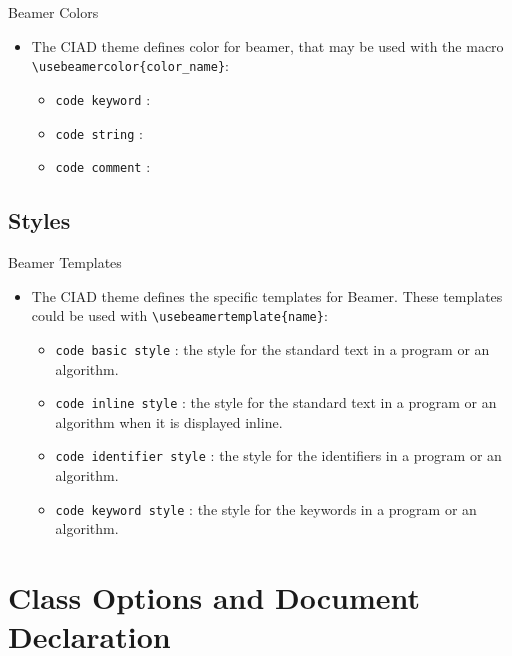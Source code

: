 \documentclass[english,sectioncirclenumberstyle]{ciadbeamer}
\begin{document}
\begin{frame}{Beamer Colors}
	\begin{itemize}
	\item The CIAD theme defines color for beamer, that may be used with the macro \texttt{{\textbackslash}usebeamercolor\{color\_name\}}:
		\begin{itemize}
		\item \texttt{code keyword} : 
		\vfill
		\item \texttt{code string} : 
		\vfill
		\item \texttt{code comment} : 
		\end{itemize}
	\end{itemize}
\end{frame}

\subsection{Styles}
\begin{frame}{Beamer Templates}
	\begin{itemize}
	\item The CIAD theme defines the specific templates for Beamer. These templates could be used with 
		\texttt{{\textbackslash}usebeamertemplate\{name\}}:
		\begin{itemize}
		\item \texttt{code basic style} : the style for the standard text in a program or an algorithm. 
		\vfill
		\item \texttt{code inline style} : the style for the standard text in a program or an algorithm when it is displayed inline. 
		\vfill
		\item \texttt{code identifier style} : the style for the identifiers in a program or an algorithm. 
		\vfill
		\item \texttt{code keyword style} : the style for the keywords in a program or an algorithm. 
		\end{itemize}
	\end{itemize}
\end{frame}

\section{Class Options and Document Declaration}
\sectiontableofcontentslide
\end{document}
